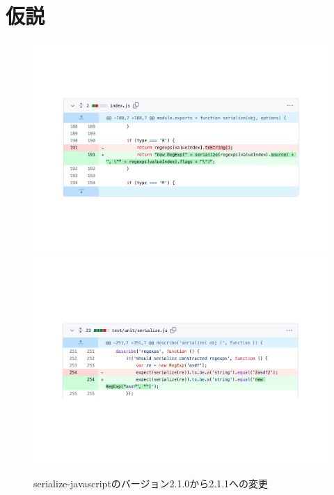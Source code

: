 \documentclass[submit]{ipsj}
\begin{document}
\section{仮説}
\label{sec:hypothesis}

\begin{figure}[t]
  \centering
  \includegraphics[width=1.0\linewidth]{Maekawa_fig/rq1/serialize-javascript/index.pdf}
  \includegraphics[width=1.0\linewidth]{Maekawa_fig/rq1/serialize-javascript/index.test.pdf}
  \caption{serialize-javascriptのバージョン2.1.0から2.1.1への変更}
  \label{fig:motivation}
\end{figure}


\end{document}
